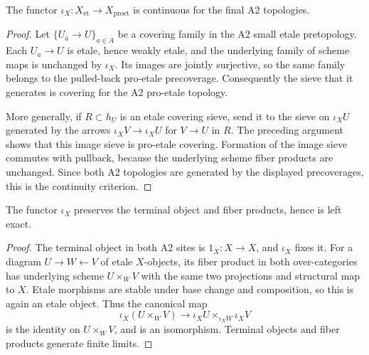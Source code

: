\begin{lemma}
\label{lemma:weil-pbc-etale-proetale-continuous}
The functor $\iota_X:X_{\mathrm{et}}\to X_{\mathrm{proet}}$ is continuous
for the final A2 topologies.
\end{lemma}
\begin{proof}

Let $\{U_a\to U\}_{a\in A}$ be a covering family in the A2 small etale
pretopology.  Each $U_a\to U$ is etale, hence weakly etale, and the underlying
family of scheme maps is unchanged by $\iota_X$.  Its images are jointly
surjective, so the same family belongs to the pulled-back pro-etale
precoverage.  Consequently the sieve that it generates is covering for the
A2 pro-etale topology.

More generally, if $R\subset h_U$ is an etale covering sieve, send it to the
sieve on $\iota_XU$ generated by the arrows $\iota_XV\to\iota_XU$ for
$V\to U$ in $R$.  The preceding argument shows that this image sieve is
pro-etale covering.  Formation of the image sieve commutes with pullback,
because the underlying scheme fiber products are unchanged.  Since both A2
topologies are generated by the displayed precoverages, this is the
continuity criterion.
\end{proof}

\begin{lemma}
\label{lemma:weil-pbc-etale-proetale-left-exact}
The functor $\iota_X$ preserves the terminal object and fiber products, hence
is left exact.
\end{lemma}
\begin{proof}

The terminal object in both A2 sites is $1_X:X\to X$, and $\iota_X$ fixes it.
For a diagram $U\to W\leftarrow V$ of etale $X$-objects, its fiber product in
both over-categories has underlying scheme $U\times_WV$ with the same two
projections and structural map to $X$.  Etale morphisms are stable under base
change and composition, so this is again an etale object.  Thus the canonical
map
\[
 \iota_X(U\times_WV)\longrightarrow
 \iota_XU\times_{\iota_XW}\iota_XV
\]
is the identity on $U\times_WV$, and is an isomorphism.  Terminal objects and
fiber products generate finite limits.
\end{proof}

